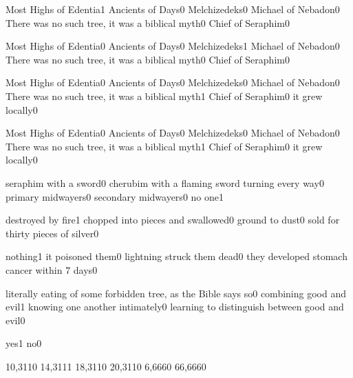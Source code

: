 {Most Highs of Edentia}{1}
{Ancients of Days}{0}
{Melchizedeks}{0}
{Michael of Nebadon}{0}
{There was no such tree, it was a biblical myth}{0}
{Chief of Seraphim}{0}
\qstop

{Most Highs of Edentia}{0}
{Ancients of Days}{0}
{Melchizedeks}{1}
{Michael of Nebadon}{0}
{There was no such tree, it was a biblical myth}{0}
{Chief of Seraphim}{0}
\qstop

{Most Highs of Edentia}{0}
{Ancients of Days}{0}
{Melchizedeks}{0}
{Michael of Nebadon}{0}
{There was no such tree, it was a biblical myth}{1}
{Chief of Seraphim}{0}
{it grew locally}{0}
\qstop

{Most Highs of Edentia}{0}
{Ancients of Days}{0}
{Melchizedeks}{0}
{Michael of Nebadon}{0}
{There was no such tree, it was a biblical myth}{1}
{Chief of Seraphim}{0}
{it grew locally}{0}
\qstop


{seraphim with a sword}{0}
{cherubim with a flaming sword turning every way}{0}
{primary midwayers}{0}
{secondary midwayers}{0}
{no one}{1}
\qstop

{destroyed by fire}{1}
{chopped into pieces and swallowed}{0}
{ground to dust}{0}
{sold for thirty pieces of silver}{0}
\qstop

{nothing}{1}
{it poisoned them}{0}
{lightning struck them dead}{0}
{they developed stomach cancer within 7 days}{0}
\qstop

{literally eating of some forbidden tree, as the Bible says so}{0}
{combining good and evil}{1}
{knowing one another intimately}{0}
{learning to distinguish between good and evil}{0}
\qstop


{yes}{1}
{no}{0}
\qstop

{10,311}{0}
{14,311}{1}
{18,311}{0}
{20,311}{0}
{6,666}{0}
{66,666}{0}
\qstop

